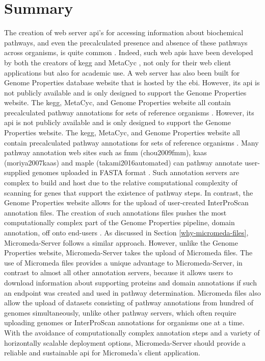 \section{Summary} \label{server-summary}

The creation of web server \gls{api}'s for accessing information about biochemical pathways, and even the precalculated presence and absence of these pathways across organisms, is quite common \cite{wu2006kobas,moriya2010pathpred,pireddu2006path,vallenet2009microscope,aziz2008rast,takami2016automated,moriya2007kaas,chou2009fmm}. Indeed, such web \gls{api}s have been developed by both the creators of \gls{kegg}  \cite{kawashima2003kegg} and MetaCyc \cite{karp2013data}, not only for their web client applications but also for academic use. A web server has also been built for Genome Properties database website \cite{richardson2018genome} that is hosted by the \gls{ebi}. However, its \gls{api} is not publicly available and is only designed to support the Genome Properties website. The \gls{kegg}, MetaCyc, and Genome Properties website all contain precalculated pathway annotations for sets of reference organisms \cite{kanehisa2000kegg,karp2002metacyc,karp2013data}. However, its \gls{api} is not publicly available and is only designed to support the Genome Properties website. The \gls{kegg}, MetaCyc, and Genome Properties website all contain precalculated pathway annotations for sets of reference organisms \cite{kanehisa2000kegg,karp2002metacyc,karp2013data}. Many pathway annotation web sites such as \gls{fmm} (chou2009fmm), \gls{kaas} (moriya2007kaas) and \gls{maple} (takami2016automated) can pathway annotate user-supplied genomes uploaded in FASTA format \cite{pearson19905}. Such annotation servers are complex to build and host due to the relative computational complexity of scanning for genes that support the existence of pathway steps. In contrast, the Genome Properties website allows for the upload of user-created InterProScan annotation files. The creation of such annotations files pushes the most computationally complex part of the Genome Properties pipeline, domain annotation, off onto end-users \cite{richardson2018genome}. As discussed in Section \ref{why-micromeda-files}, Micromeda-Server follows a similar approach. However, unlike the Genome Properties website, Micromeda-Server takes the upload of Micromeda files. The use of Micromeda files provides a unique advantage to Micromeda-Server, in contrast to almost all other annotation servers, because it allows users to download information about supporting proteins and domain annotations if such an endpoint was created and used in pathway determination. Micromeda files also allow the upload of datasets consisting of pathway annotations from hundred of genomes simultaneously, unlike other pathway servers, which often require uploading genomes or InterProScan annotations for organisms one at a time. With the avoidance of computationally complex annotation steps and a variety of horizontally scalable deployment options, Micromeda-Server should provide a reliable and sustainable \gls{api} for Micromeda's client application.